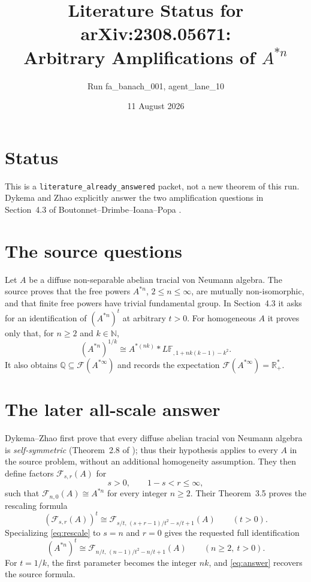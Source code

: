 \documentclass[11pt]{article}
\title{Literature Status for arXiv:2308.05671:\\Arbitrary Amplifications of $A^{*n}$}
\author{Run fa\_banach\_001, agent\_lane\_10}
\date{11 August 2026}
\newcommand{\Fcal}{\mathcal F}
\begin{document}
\maketitle

\section*{Status}

This is a \texttt{literature\_already\_answered} packet, not a new theorem of
this run.  Dykema and Zhao \cite{DZ} explicitly answer the two amplification
questions in Section~4.3 of Boutonnet--Drimbe--Ioana--Popa \cite{BDIP}.

\section*{The source questions}

Let $A$ be a diffuse non-separable abelian tracial von Neumann algebra.  The
source proves that the free powers $A^{*n}$, $2\le n\le\infty$, are mutually
non-isomorphic, and that finite free powers have trivial fundamental group.
In Section~4.3 it asks for an identification of $(A^{*n})^t$ at arbitrary
$t>0$.  For homogeneous $A$ it proves only that, for $n\ge2$ and
$k\in\mathbb N$,
\[
 (A^{*n})^{1/k}
 \cong A^{*(nk)}*L\mathbb F_{,1+nk(k-1)-k^2}.
\]
It also obtains
$\mathbb Q\subseteq\Fcal(A^{*\infty})$ and records the expectation
$\Fcal(A^{*\infty})=\mathbb R_+^*$.

\section*{The later all-scale answer}

Dykema--Zhao first prove that every diffuse abelian tracial von Neumann
algebra is \emph{self-symmetric} (Theorem~2.8 of \cite{DZ}); thus their
hypothesis applies to every $A$ in the source problem, without an additional
homogeneity assumption.  They then define factors $\Fcal_{s,r}(A)$ for
\[
 s>0,\qquad 1-s<r\le\infty,
\]
such that $\Fcal_{n,0}(A)\cong A^{*n}$ for every integer $n\ge2$.  Their
Theorem~3.5 proves the rescaling formula
\begin{equation}\label{eq:rescale}
 (\Fcal_{s,r}(A))^t
 \cong
 \Fcal_{s/t,\,(s+r-1)/t^2-s/t+1}(A)
 \qquad(t>0).
\end{equation}
Specializing \eqref{eq:rescale} to $s=n$ and $r=0$ gives the requested full
identification
\begin{equation}\label{eq:answer}
 \boxed{
 (A^{*n})^t
 \cong
 \Fcal_{n/t,\,(n-1)/t^2-n/t+1}(A)
 }
 \qquad(n\ge2,\ t>0).
\end{equation}
For $t=1/k$, the first parameter becomes the integer $nk$, and
\eqref{eq:answer} recovers the source formula.
\end{document}
